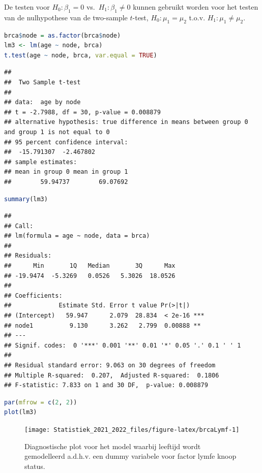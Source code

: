 \documentclass[
  12pt,dutch,coursenotes]{book}
\theoremstyle{definition}
\theoremstyle{definition}
\theoremstyle{definition}
\theoremstyle{definition}
\theoremstyle{remark}
\begin{document}
De testen voor \(H_0:\beta_1=0\) vs.~\(H_1:\beta_1\neq0\) kunnen gebruikt worden voor het testen van de nulhypothese van de two-sample \(t\)-test, \(H_0:\mu_1=\mu_2\) t.o.v. \(H_1:\mu_1\neq\mu_2\).

\begin{lstlisting}[language=R]
brca$node = as.factor(brca$node)
lm3 <- lm(age ~ node, brca)
t.test(age ~ node, brca, var.equal = TRUE)
\end{lstlisting}

\begin{lstlisting}
## 
##  Two Sample t-test
## 
## data:  age by node
## t = -2.7988, df = 30, p-value = 0.008879
## alternative hypothesis: true difference in means between group 0 and group 1 is not equal to 0
## 95 percent confidence interval:
##  -15.791307  -2.467802
## sample estimates:
## mean in group 0 mean in group 1 
##        59.94737        69.07692
\end{lstlisting}

\begin{lstlisting}[language=R]
summary(lm3)
\end{lstlisting}

\begin{lstlisting}
## 
## Call:
## lm(formula = age ~ node, data = brca)
## 
## Residuals:
##      Min       1Q   Median       3Q      Max 
## -19.9474  -5.3269   0.0526   5.3026  18.0526 
## 
## Coefficients:
##             Estimate Std. Error t value Pr(>|t|)    
## (Intercept)   59.947      2.079  28.834  < 2e-16 ***
## node1          9.130      3.262   2.799  0.00888 ** 
## ---
## Signif. codes:  0 '***' 0.001 '**' 0.01 '*' 0.05 '.' 0.1 ' ' 1
## 
## Residual standard error: 9.063 on 30 degrees of freedom
## Multiple R-squared:  0.207,  Adjusted R-squared:  0.1806 
## F-statistic: 7.833 on 1 and 30 DF,  p-value: 0.008879
\end{lstlisting}

\begin{lstlisting}[language=R]
par(mfrow = c(2, 2))
plot(lm3)
\end{lstlisting}

\begin{figure}

{\centering \texttt{[image: Statistiek\_2021\_2022\_files/figure-latex/brcaLymf-1]} 

}

\caption{Diagnostische plot voor het model waarbij leeftijd wordt gemodelleerd a.d.h.v. een dummy variabele voor factor lymfe knoop status.}\label{fig:brcaLymf}
\end{figure}
\end{document}
